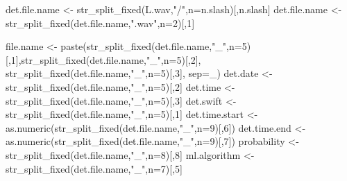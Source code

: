 \documentclass[
]{book}
\newenvironment{Shaded}{\begin{snugshade}}{\end{snugshade}}
\newcommand{\AttributeTok}[1]{\textcolor[rgb]{0.77,0.63,0.00}{#1}}
\newcommand{\DecValTok}[1]{\textcolor[rgb]{0.00,0.00,0.81}{#1}}
\newcommand{\FunctionTok}[1]{\textcolor[rgb]{0.00,0.00,0.00}{#1}}
\newcommand{\NormalTok}[1]{#1}
\newcommand{\OtherTok}[1]{\textcolor[rgb]{0.56,0.35,0.01}{#1}}
\newcommand{\StringTok}[1]{\textcolor[rgb]{0.31,0.60,0.02}{#1}}
\begin{document}
\begin{Shaded}
\begin{Highlighting}[]
\NormalTok{    det.file.name }\OtherTok{\textless{}{-}} \FunctionTok{str\_split\_fixed}\NormalTok{(L.wav,}\StringTok{"/"}\NormalTok{,}\AttributeTok{n=}\NormalTok{n.slash)[,n.slash]}
\NormalTok{    det.file.name }\OtherTok{\textless{}{-}} \FunctionTok{str\_split\_fixed}\NormalTok{(det.file.name,}\StringTok{".wav"}\NormalTok{,}\AttributeTok{n=}\DecValTok{2}\NormalTok{)[,}\DecValTok{1}\NormalTok{]}
    
\NormalTok{    file.name }\OtherTok{\textless{}{-}} \FunctionTok{paste}\NormalTok{(}\FunctionTok{str\_split\_fixed}\NormalTok{(det.file.name,}\StringTok{"\_"}\NormalTok{,}\AttributeTok{n=}\DecValTok{5}\NormalTok{)[,}\DecValTok{1}\NormalTok{],}\FunctionTok{str\_split\_fixed}\NormalTok{(det.file.name,}\StringTok{"\_"}\NormalTok{,}\AttributeTok{n=}\DecValTok{5}\NormalTok{)[,}\DecValTok{2}\NormalTok{],}
                       \FunctionTok{str\_split\_fixed}\NormalTok{(det.file.name,}\StringTok{"\_"}\NormalTok{,}\AttributeTok{n=}\DecValTok{5}\NormalTok{)[,}\DecValTok{3}\NormalTok{], }\AttributeTok{sep=}\StringTok{\textquotesingle{}\_\textquotesingle{}}\NormalTok{)}
\NormalTok{    det.date }\OtherTok{\textless{}{-}} \FunctionTok{str\_split\_fixed}\NormalTok{(det.file.name,}\StringTok{"\_"}\NormalTok{,}\AttributeTok{n=}\DecValTok{5}\NormalTok{)[,}\DecValTok{2}\NormalTok{]}
\NormalTok{    det.time }\OtherTok{\textless{}{-}} \FunctionTok{str\_split\_fixed}\NormalTok{(det.file.name,}\StringTok{"\_"}\NormalTok{,}\AttributeTok{n=}\DecValTok{5}\NormalTok{)[,}\DecValTok{3}\NormalTok{]}
\NormalTok{    det.swift }\OtherTok{\textless{}{-}} \FunctionTok{str\_split\_fixed}\NormalTok{(det.file.name,}\StringTok{"\_"}\NormalTok{,}\AttributeTok{n=}\DecValTok{5}\NormalTok{)[,}\DecValTok{1}\NormalTok{]}
\NormalTok{    det.time.start }\OtherTok{\textless{}{-}} \FunctionTok{as.numeric}\NormalTok{(}\FunctionTok{str\_split\_fixed}\NormalTok{(det.file.name,}\StringTok{"\_"}\NormalTok{,}\AttributeTok{n=}\DecValTok{9}\NormalTok{)[,}\DecValTok{6}\NormalTok{])}
\NormalTok{    det.time.end }\OtherTok{\textless{}{-}} \FunctionTok{as.numeric}\NormalTok{(}\FunctionTok{str\_split\_fixed}\NormalTok{(det.file.name,}\StringTok{"\_"}\NormalTok{,}\AttributeTok{n=}\DecValTok{9}\NormalTok{)[,}\DecValTok{7}\NormalTok{])}
\NormalTok{    probability }\OtherTok{\textless{}{-}} \FunctionTok{str\_split\_fixed}\NormalTok{(det.file.name,}\StringTok{"\_"}\NormalTok{,}\AttributeTok{n=}\DecValTok{8}\NormalTok{)[,}\DecValTok{8}\NormalTok{]}
\NormalTok{    ml.algorithm }\OtherTok{\textless{}{-}} \FunctionTok{str\_split\_fixed}\NormalTok{(det.file.name,}\StringTok{"\_"}\NormalTok{,}\AttributeTok{n=}\DecValTok{7}\NormalTok{)[,}\DecValTok{5}\NormalTok{]}
    

\end{Highlighting}
\end{Shaded}
\end{document}
